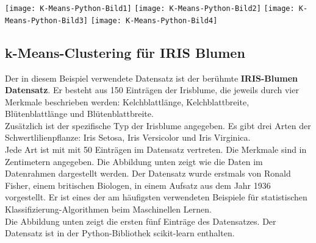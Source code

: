 \documentclass[12pt]{article}
\begin{document}
\begin{center}
\hspace*{-2.0cm}   
\texttt{[image: K-Means-Python-Bild1]}
\hspace*{-2.0cm}   
\texttt{[image: K-Means-Python-Bild2]}
\hspace*{-2.0cm} 
\texttt{[image: K-Means-Python-Bild3]}
\hspace*{-2.0cm} 
\texttt{[image: K-Means-Python-Bild4]}
\end{center}

\subsection{k-Means-Clustering für IRIS Blumen}


Der in diesem Beispiel verwendete Datensatz ist der berühmte \textbf{IRIS-Blumen Datensatz}. Er besteht aus 150 Einträgen der Irisblume, die jeweils durch vier Merkmale beschrieben werden: Kelchblattlänge, Kelchblattbreite, Blütenblattlänge und
Blütenblattbreite. \\[0.2cm]
Zusätzlich ist der spezifische Typ der Irisblume angegeben. Es gibt drei Arten
der Schwertlilienpflanze: Iris Setosa, Iris Versicolor und Iris Virginica.\\
Jede Art ist mit mit 50 Einträgen im Datensatz vertreten. Die Merkmale sind in Zentimetern angegeben. Die Abbildung unten zeigt wie die Daten im Datenrahmen dargestellt werden. Der Datensatz wurde erstmals von Ronald Fisher, einem britischen Biologen, in einem Aufsatz aus dem Jahr 1936 vorgestellt. Er ist eines der am häufigsten verwendeten Beispiele für statistischen Klassifizierung-Algorithmen beim Maschinellen Lernen. \\
Die Abbildung unten zeigt die ersten fünf Einträge des Datensatzes. Der Datensatz ist in der Python-Bibliothek scikit-learn enthalten.\\ 
\end{document}

